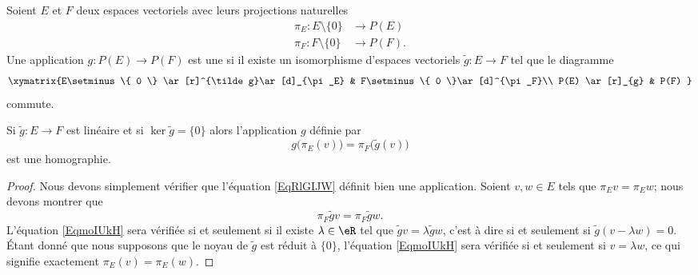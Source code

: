 \begin{definition}
    Soient \( E\) et \( F\) deux espaces vectoriels avec leurs projections naturelles
    \begin{subequations}
        \begin{align}
            \pi_E\colon E\setminus\{ 0 \}&\to P(E)\\
            \pi_F\colon F\setminus\{ 0 \}&\to P(F).
        \end{align}
    \end{subequations}
    Une application \( g\colon P(E)\to P(F)\) est une  si il existe un isomorphisme d'espaces vectoriels \( \tilde g\colon E\to F\) tel que le diagramme
    \begin{equation}
        \xymatrix{%
        E\setminus\{ 0 \} \ar[r]^{\tilde g}\ar[d]_{\pi_E}        &   F\setminus\{ 0 \}\ar[d]^{\pi_F}\\
           P(E) \ar[r]_{g}   &   P(F)
           }
    \end{equation}
    commute.
\end{definition}

\begin{lemma}
    Si \( \tilde g\colon E\to F\) est linéaire et si \( \ker\tilde g=\{ 0 \}\) alors l'application \( g\) définie par
    \begin{equation}        \label{EqRlGIJW}
        g\big( \pi_E(v) \big)=\pi_F\big( \tilde g(v) \big)
    \end{equation}
    est une homographie.
\end{lemma}

\begin{proof}
    Nous devons simplement vérifier que l'équation \eqref{EqRlGIJW} définit bien une application. Soient \( v,w\in E\) tels que \( \pi_Ev=\pi_Ew\); nous devons montrer que 
    \begin{equation}        \label{EqmoIUkH}
        \pi_F\tilde gv=\pi_F\tilde gw.
    \end{equation}
    L'équation \eqref{EqmoIUkH} sera vérifiée si et seulement si il existe \( \lambda\in\eR\) tel que \( \tilde gv=\lambda\tilde gw\), c'est à dire si et seulement si \( \tilde g(v-\lambda w)=0\). Étant donné que nous supposons que le noyau de \( \tilde g\) est réduit à \( \{ 0 \}\), l'équation \eqref{EqmoIUkH} sera vérifiée si et seulement si \( v=\lambda w\), ce qui signifie exactement \( \pi_E(v)=\pi_E(w)\).
\end{proof}

